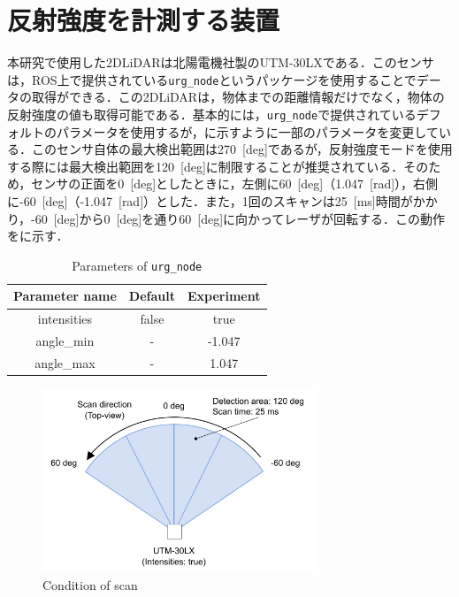 
\section{反射強度を計測する装置}

  本研究で使用した2DLiDARは北陽電機社製のUTM-30LX\cite{hokuyo}である．このセンサは，ROS上で提供されている\texttt{urg\_node}\cite{urg_node}というパッケージを使用することでデータの取得ができる．この2DLiDARは，物体までの距離情報だけでなく，物体の反射強度の値も取得可能である．基本的には，\texttt{urg\_node}で提供されているデフォルトのパラメータを使用するが，に示すように一部のパラメータを変更している．このセンサ自体の最大検出範囲は270 \,[deg]であるが，反射強度モードを使用する際には最大検出範囲を120 \,[deg]に制限することが推奨されている\cite{urg_node}．そのため，センサの正面を0 \,[deg]としたときに，左側に60 \,[deg]（1.047 \,[rad]），右側に-60 \,[deg]（-1.047 \,[rad]）とした．また，1回のスキャンは25 \,[ms]時間がかかり，-60 \,[deg]から0 \,[deg]を通り60 \,[deg]に向かってレーザが回転する．この動作をに示す．

  \begin{table}[hbtp]
    \caption{Parameters of \texttt{urg\_node}}
    \label{tab:parameters_of_urg_node}
    \centering
    \begin{tabular}{c|cc}
    \hline
    Parameter name & Default & Experiment \\ 
    \hline
    \hline
    intensities & false   & true         \\ 
    angle\_min  & -       & -1.047       \\ 
    angle\_max  & -       & 1.047        \\ 
    \hline
    \end{tabular}
    \end{table}

    \vspace{-0.5cm}

    \begin{figure}[h]
      \centering
      \includegraphics[height=5.5cm] {images/pdf/RobotGuidance_hokuyo_scan}
      \captionsetup{justification=raggedright} %
      \caption{Condition of scan}
      \label{Fig:Image of scan}
    \end{figure}

\newpage
